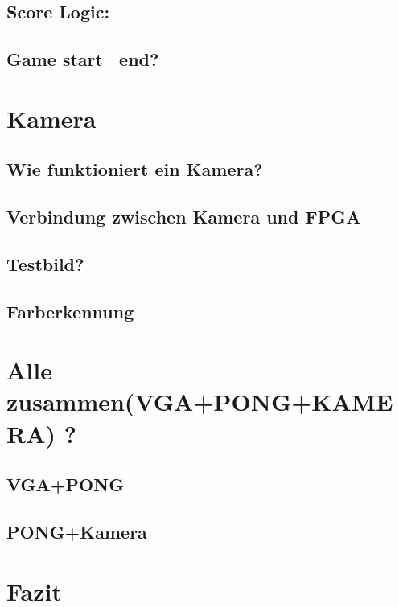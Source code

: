 \documentclass[a4paper, 11pt]{article}
\begin{document}
\subsection{Score Logic:}
\subsection{Game start \ end?}

\section{Kamera}
\subsection{Wie funktioniert ein Kamera?}
\subsection{Verbindung zwischen Kamera und FPGA}
\subsection{Testbild?}
\subsection{Farberkennung}

\section{Alle zusammen(VGA+PONG+KAMERA) ?}
\subsection{VGA+PONG}
\subsection{PONG+Kamera}

\section{Fazit}
\end{document}
